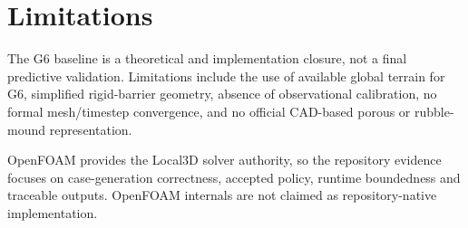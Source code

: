 \section{Limitations}

The G6 baseline is a theoretical and implementation closure, not a final predictive validation. Limitations include the use of available global terrain for G6, simplified rigid-barrier geometry, absence of observational calibration, no formal mesh/timestep convergence, and no official CAD-based porous or rubble-mound representation.

OpenFOAM provides the Local3D solver authority, so the repository evidence focuses on case-generation correctness, accepted policy, runtime boundedness and traceable outputs. OpenFOAM internals are not claimed as repository-native implementation.
